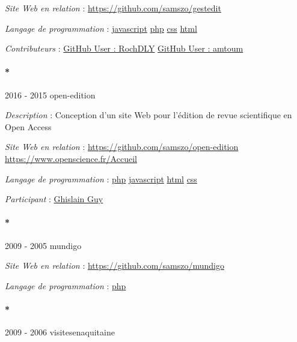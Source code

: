 \documentclass[
  a4paper,
  DIV=11,
  numbers=noendperiod]{scrreprt}
\let\oldparagraph\paragraph
\renewcommand{\paragraph}[1]{\oldparagraph{#1}\mbox{}}
\begin{document}
\emph{Site Web en relation} : \url{https://github.com/samszo/gestedit}

\emph{Langage de programmation} :
\href{http://localhost/samszo/omk/s/fiches/item/89711}{javascript}
\href{http://localhost/samszo/omk/s/fiches/item/108369}{php}
\href{http://localhost/samszo/omk/s/fiches/item/102418}{css}
\href{http://localhost/samszo/omk/s/fiches/item/96621}{html}

\emph{Contributeurs} :
\href{http://localhost/samszo/omk/s/fiches/item/300795}{GitHub User :
RochDLY} \href{http://localhost/samszo/omk/s/fiches/item/301093}{GitHub
User : amtoum}

\paragraph*{2016 - 2015 open-edition}\label{sec-item299730}

\emph{Description} : Conception d'un site Web pour l'édition de revue
scientifique en Open Access

\emph{Site Web en relation} :
\url{https://github.com/samszo/open-edition}
\url{https://www.openscience.fr/Accueil}

\emph{Langage de programmation} :
\href{http://localhost/samszo/omk/s/fiches/item/108369}{php}
\href{http://localhost/samszo/omk/s/fiches/item/89711}{javascript}
\href{http://localhost/samszo/omk/s/fiches/item/96621}{html}
\href{http://localhost/samszo/omk/s/fiches/item/102418}{css}

\emph{Participant} :
\href{http://localhost/samszo/omk/s/fiches/item/299621}{Ghislain Guy}

\paragraph*{2009 - 2005 mundigo}\label{sec-item301796}

\emph{Site Web en relation} : \url{https://github.com/samszo/mundigo}

\emph{Langage de programmation} :
\href{http://localhost/samszo/omk/s/fiches/item/108369}{php}

\paragraph*{2009 - 2006 visitesenaquitaine}\label{sec-item301798}
\end{document}
